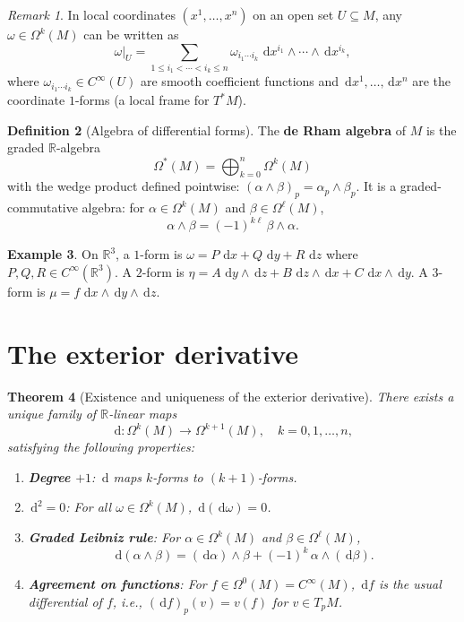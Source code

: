 \documentclass[12pt,a4paper,openany]{book}
\newtheorem{theorem}{Theorem}[section]
\theoremstyle{definition}
\newtheorem{definition}[theorem]{Definition}
\newtheorem{example}[theorem]{Example}
\theoremstyle{remark}
\newtheorem{remark}[theorem]{Remark}
\newcommand{\R}{\mathbb{R}}
\newcommand{\dd}{\,\mathrm{d}}
\begin{document}
\begin{remark}\label{rem:local-expression-forms}
In local coordinates $(x^1, \ldots, x^n)$ on an open set $U \subseteq M$,
any $\omega \in \Omega^k(M)$ can be written as
\[
  \omega\big|_U = \sum_{1 \leq i_1 < \cdots < i_k \leq n}
    \omega_{i_1 \cdots i_k}\, \dd x^{i_1} \wedge \cdots \wedge \dd x^{i_k},
\]
where $\omega_{i_1 \cdots i_k} \in C^\infty(U)$ are smooth coefficient
functions and $\dd x^1, \ldots, \dd x^n$ are the coordinate $1$-forms
(a local frame for $T^*M$).
\end{remark}

\begin{definition}[Algebra of differential forms]\label{def:form-algebra}
The \textbf{de Rham algebra} of $M$ is the graded
$\R$-algebra
\[
  \Omega^*(M) = \bigoplus_{k=0}^{n} \Omega^k(M)
\]
with the wedge product defined pointwise:
$(\alpha \wedge \beta)_p = \alpha_p \wedge \beta_p$.
It is a graded-commutative algebra: for $\alpha \in \Omega^k(M)$ and
$\beta \in \Omega^\ell(M)$,
\[
  \alpha \wedge \beta = (-1)^{k\ell}\, \beta \wedge \alpha.
\]
\end{definition}

\begin{example}\label{ex:1-forms-R3}
On $\R^3$, a $1$-form is $\omega = P\,\dd x + Q\,\dd y + R\,\dd z$
where $P, Q, R \in C^\infty(\R^3)$. A $2$-form is
$\eta = A\,\dd y \wedge \dd z + B\,\dd z \wedge \dd x + C\,\dd x \wedge \dd y$.
A $3$-form is $\mu = f\,\dd x \wedge \dd y \wedge \dd z$.
\end{example}

\section{The exterior derivative}\label{sec:exterior-derivative}

\begin{theorem}[Existence and uniqueness of the exterior derivative]
\label{thm:exterior-derivative}
There exists a unique family of $\R$-linear maps
\[
  \dd \colon \Omega^k(M) \to \Omega^{k+1}(M), \quad k = 0, 1, \ldots, n,
\]
satisfying the following properties:
\begin{enumerate}[label=(\roman*)]
  \item \textbf{Degree $+1$}: $\dd$ maps $k$-forms to $(k+1)$-forms.
  \item \textbf{$\dd^2 = 0$}: For all $\omega \in \Omega^k(M)$,
    $\dd(\dd\omega) = 0$.
  \item \textbf{Graded Leibniz rule}: For $\alpha \in \Omega^k(M)$ and
    $\beta \in \Omega^\ell(M)$,
    \[
      \dd(\alpha \wedge \beta) = (\dd\alpha) \wedge \beta
        + (-1)^k\, \alpha \wedge (\dd\beta).
    \]
  \item \textbf{Agreement on functions}: For $f \in \Omega^0(M)
    = C^\infty(M)$, $\dd f$ is the usual differential of $f$, i.e.,
    $(\dd f)_p(v) = v(f)$ for $v \in T_p M$.
\end{enumerate}
\end{theorem}
\end{document}
